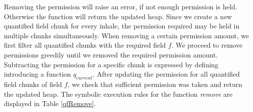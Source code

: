 \documentclass[12pt]{article}
\begin{document}
Removing the permission will raise an error, if not enough permission is held. Otherwise the function will return the updated heap. Since we create a new quantified field chunk for every inhale, the permission required may be held in multiple chunks simultaneously. When removing a certain permission amount, we first filter all quantified chunks with the required field \(f\). 
We proceed to remove permissions greedily until we removed the required permission amount. Subtracting the permission for a specific chunk is expressed by defining introducing a function \(q_{current}\). After updating the permission for all quantified field chunks of field \(f\), we check that sufficient permission was taken and return the updated heap.
The symbolic execution rules for the function \textit{remove} are displayed in Table \ref{qfRemove}.
\end{document}

